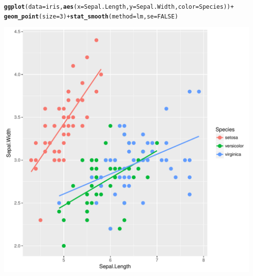 \documentclass[12pt,oneside]{book}\usepackage[]{graphicx}\usepackage[]{color}
\makeatletter
\def\maxwidth{ %
  \ifdim\Gin@nat@width>\linewidth
    \linewidth
  \else
    \Gin@nat@width
  \fi
}
\newcommand{\hlnum}[1]{\textcolor[rgb]{0.686,0.059,0.569}{#1}}%
\newcommand{\hlopt}[1]{\textcolor[rgb]{0,0,0}{#1}}%
\newcommand{\hlstd}[1]{\textcolor[rgb]{0.345,0.345,0.345}{#1}}%
\newcommand{\hlkwc}[1]{\textcolor[rgb]{0.333,0.667,0.333}{#1}}%
\newcommand{\hlkwd}[1]{\textcolor[rgb]{0.737,0.353,0.396}{\textbf{#1}}}%
\newenvironment{kframe}{%
 \def\at@end@of@kframe{}%
 \ifinner\ifhmode%
  \def\at@end@of@kframe{\end{minipage}}%
  \begin{minipage}{\columnwidth}%
 \fi\fi%
 \def\FrameCommand##1{\hskip\@totalleftmargin \hskip-\fboxsep
 \colorbox{shadecolor}{##1}\hskip-\fboxsep
     \hskip-\linewidth \hskip-\@totalleftmargin \hskip\columnwidth}%
 \MakeFramed {\advance\hsize-\width
   \@totalleftmargin\z@ \linewidth\hsize
   \@setminipage}}%
 {\par\unskip\endMakeFramed%
 \at@end@of@kframe}
\newenvironment{knitrout}{}{} %
\makeatother
\begin{document}
\begin{knitrout}
\color{fgcolor}\begin{kframe}
\begin{alltt}
\hlkwd{ggplot}\hlstd{(}\hlkwc{data} \hlstd{= iris,} \hlkwd{aes}\hlstd{(}\hlkwc{x} \hlstd{= Sepal.Length,} \hlkwc{y} \hlstd{= Sepal.Width,} \hlkwc{color} \hlstd{= Species))} \hlopt{+}
    \hlkwd{geom_point}\hlstd{(}\hlkwc{size}\hlstd{=}\hlnum{3}\hlstd{)} \hlopt{+} \hlkwd{stat_smooth}\hlstd{(}\hlkwc{method} \hlstd{= lm,} \hlkwc{se}\hlstd{=}\hlnum{FALSE}\hlstd{)}
\end{alltt}
\end{kframe}
\includegraphics[width=\maxwidth]{figure/unnamed-chunk-67-1} 

\end{knitrout}
\end{document}
